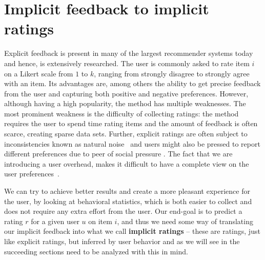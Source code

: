 




\label{implicit-feedback}
\section{Implicit feedback to implicit ratings}
\label{sec:implicit}


Explicit feedback is present in many of the largest recommender systems today
and hence, is extensively researched. The user is commonly asked to
rate item $i$ on a Likert scale from $1$ to $k$, ranging from strongly
disagree to strongly agree with an item. Its advantages are, among others the
ability to get precise feedback from the user and capturing both positive and
negative preferences. However, although having a high popularity, the method
has multiple weaknesses. The most prominent weakness is the difficulty of
collecting ratings: the method requires the user to spend time rating items and
the amount of feedback is often scarce, creating sparse data sets. Further,
explicit ratings are often subject to inconsistencies known as natural
noise~\cite{amatriain2009like} and users might also be pressed to report
different preferences due to peer of social pressure . The fact that we are
introducing a user overhead, makes it difficult to have a complete view on the
user preferences~\cite{Jawaheer2010}.

We can try to achieve better results and create a more pleasant experience for
the user, by looking at behavioral statistics, which is both easier to collect
and does not require any extra effort from the user. Our end-goal is to predict
a rating $r$ for a given user $u$ on item $i$, and thus we need some way of
translating our implicit feedback into what we call \textbf{implicit ratings} –
these are ratings, just like explicit ratings, but inferred by user behavior
and as we will see in the succeeding sections need to be analyzed with this in
mind.

